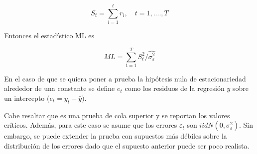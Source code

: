 \begin{equation}
\label{eq: 5}
S_t=\sum_{i=1}^t r_i, \quad t=1,....,T   
\end{equation}

Entonces el estadístico ML es 

\begin{equation}
\label{eq: 6}
ML=\sum_{t=1}^T S^2_t/\hat{\sigma^2_\varepsilon}   
\end{equation}

En el caso de que se quiera poner a prueba la hipótesis nula de estacionariedad alrededor de una constante se define $e_t$ como los residuos de la regresión $y$ sobre un intercepto ($e_t=y_t-\bar{y})$.

Cabe resaltar que es una prueba de cola superior y se reportan los valores críticos. Además, para este caso se asume que los errores $\varepsilon_t$ son $iid N(0, \sigma_{\varepsilon}^2)$. Sin embargo, se puede extender la prueba con supuestos más débiles sobre la distribución de los errores dado que el supuesto anterior puede ser poco realista.
 
\newpage


\printbibliography






